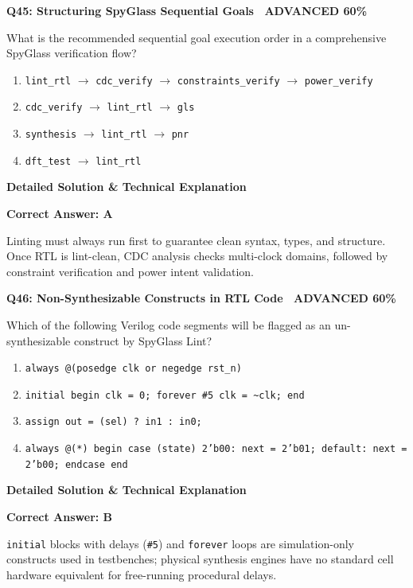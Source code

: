\documentclass[11pt,a4paper]{article}
\newcommand{\badgeadv}{{\color{white}\colorbox{advred}{\bfseries\sffamily\tiny\ ADVANCED 60\%\ }}}
\newenvironment{qbox}[2]{%
  \begin{mdframed}[style=qstyle]%
  {\bfseries\sffamily\color{primaryblue}#1 \hfill #2}\par\vspace{2pt}%
}{%
  \end{mdframed}%
}
\newenvironment{ansbox}{%
  \begin{mdframed}[style=ansstyle]%
  {\bfseries\sffamily\color{ansgreen}\small Detailed Solution \& Technical Explanation}\par\vspace{2pt}\small%
}{%
  \end{mdframed}%
}
\begin{document}
\begin{qbox}{Q45: Structuring SpyGlass Sequential Goals}{\badgeadv}
What is the recommended sequential goal execution order in a comprehensive SpyGlass verification flow?
\begin{enumerate}[label=\textbf{\Alph*.}]
  \item \texttt{lint\_rtl} $\rightarrow$ \texttt{cdc\_verify} $\rightarrow$ \texttt{constraints\_verify} $\rightarrow$ \texttt{power\_verify}
  \item \texttt{cdc\_verify} $\rightarrow$ \texttt{lint\_rtl} $\rightarrow$ \texttt{gls}
  \item \texttt{synthesis} $\rightarrow$ \texttt{lint\_rtl} $\rightarrow$ \texttt{pnr}
  \item \texttt{dft\_test} $\rightarrow$ \texttt{lint\_rtl}
\end{enumerate}
\end{qbox}
\begin{ansbox}
\textbf{Correct Answer: A}

Linting must always run first to guarantee clean syntax, types, and structure. Once RTL is lint-clean, CDC analysis checks multi-clock domains, followed by constraint verification and power intent validation.
\end{ansbox}

\begin{qbox}{Q46: Non-Synthesizable Constructs in RTL Code}{\badgeadv}
Which of the following Verilog code segments will be flagged as an un-synthesizable construct by SpyGlass Lint?
\begin{enumerate}[label=\textbf{\Alph*.}]
  \item \texttt{always @(posedge clk or negedge rst\_n)}
  \item \texttt{initial begin clk = 0; forever \#5 clk = \textasciitilde clk; end}
  \item \texttt{assign out = (sel) ? in1 : in0;}
  \item \texttt{always @(*) begin case (state) 2'b00: next = 2'b01; default: next = 2'b00; endcase end}
\end{enumerate}
\end{qbox}
\begin{ansbox}
\textbf{Correct Answer: B}

\texttt{initial} blocks with delays (\texttt{\#5}) and \texttt{forever} loops are simulation-only constructs used in testbenches; physical synthesis engines have no standard cell hardware equivalent for free-running procedural delays.
\end{ansbox}
\end{document}
